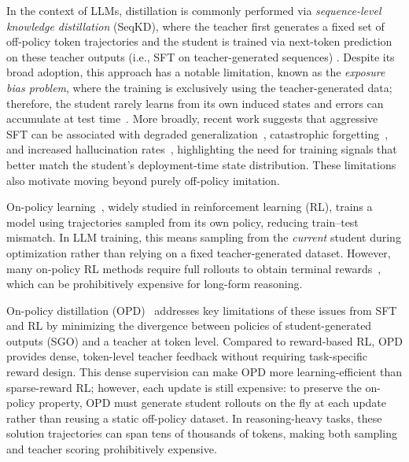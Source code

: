 \documentclass[11pt]{article}
\begin{document}
In the context of LLMs, distillation is commonly performed via  
\emph{sequence-level knowledge distillation} (SeqKD), where the teacher first generates a fixed set of off-policy token trajectories and the student is trained via next-token prediction on these teacher outputs (i.e., SFT on teacher-generated sequences)  
\cite{kim2016sequence,radford2019language,wei2022finetuned,ouyang2022training}.  
Despite its broad adoption, this approach has a notable limitation, known as the \emph{exposure bias problem}, where the training is exclusively using the teacher-generated data; therefore, the student rarely learns from its own induced states and errors can accumulate at test time~\cite{lin-etal-2020-autoregressive}.  
More broadly, recent work suggests that aggressive SFT can be associated with degraded generalization~\citep{chu2025sft}, catastrophic forgetting~\citep{luo2025empirical,kalajdzievski2024scaling}, and increased hallucination rates~\citep{gekhman2024does,kalai2025language}, highlighting the need for training signals that better match the student’s deployment-time state distribution.  
These limitations also motivate moving beyond purely off-policy imitation.  
  
On-policy learning~\cite{williams1992simple}, widely studied in reinforcement learning (RL), trains a model using trajectories sampled from its own policy, reducing train--test mismatch.  
In LLM training, this means sampling from the \emph{current} student during optimization rather than relying on a fixed teacher-generated dataset.  
However, many on-policy RL methods require full rollouts to obtain terminal rewards~\cite{tulu3}, which can be prohibitively expensive for long-form reasoning.  
  
On-policy distillation (OPD)~\citep{lin-etal-2020-autoregressive,gu2024minillm,Ko2024DistiLLMTS,agarwal2024policy,lu2025onpolicydistillation} addresses key limitations of these issues from SFT and RL by minimizing the divergence between policies of student-generated outputs (SGO) and a teacher at token level.  
Compared to reward-based RL, OPD provides dense, token-level teacher feedback without requiring task-specific reward design.  
This dense supervision can make OPD more learning-efficient than sparse-reward RL; however, each update is still expensive:  
to preserve the on-policy property, OPD must generate student rollouts on the fly at each update rather than reusing a static off-policy dataset.  
In reasoning-heavy tasks, these solution trajectories can span tens of thousands of tokens, making both sampling and teacher scoring prohibitively expensive.  
  
\end{document}
